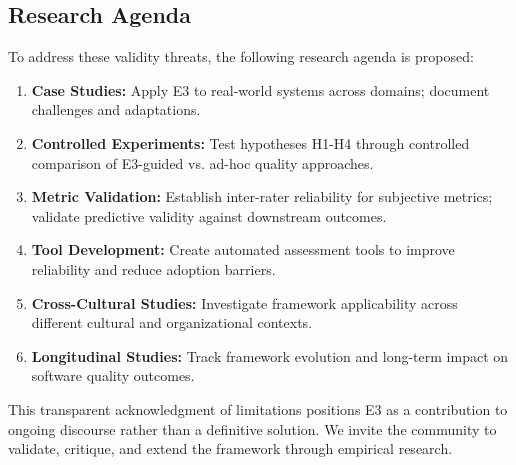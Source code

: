 \subsection{Research Agenda}

To address these validity threats, the following research agenda is proposed:

\begin{enumerate}[leftmargin=2em]
    \item \textbf{Case Studies:} Apply E3 to real-world systems across domains; document challenges and adaptations.
    \item \textbf{Controlled Experiments:} Test hypotheses H1-H4 through controlled comparison of E3-guided vs. ad-hoc quality approaches.
    \item \textbf{Metric Validation:} Establish inter-rater reliability for subjective metrics; validate predictive validity against downstream outcomes.
    \item \textbf{Tool Development:} Create automated assessment tools to improve reliability and reduce adoption barriers.
    \item \textbf{Cross-Cultural Studies:} Investigate framework applicability across different cultural and organizational contexts.
    \item \textbf{Longitudinal Studies:} Track framework evolution and long-term impact on software quality outcomes.
\end{enumerate}

This transparent acknowledgment of limitations positions E3 as a contribution to ongoing discourse rather than a definitive solution. We invite the community to validate, critique, and extend the framework through empirical research.